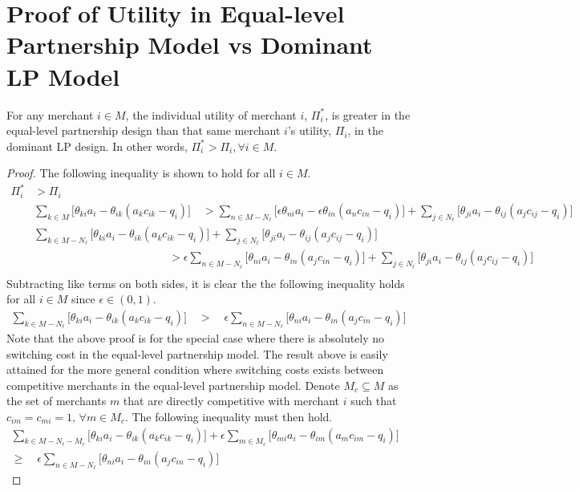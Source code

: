 \section{Proof of Utility in Equal-level Partnership Model vs Dominant LP Model}
\begin{theorem} \label{thm:utility}
For any merchant $i \in M$, the individual utility of merchant $i$, $\Pi_i^*$, is greater in the equal-level partnership design than that same merchant $i$'s utility, $\Pi_i$, in the dominant LP design. In other words, $\Pi_i^* > \Pi_i, \forall i \in M$.
\end{theorem}
%
\begin{proof}
The following inequality is shown to hold for all $i \in M$.
%
\begin{align*}
\Pi_i^* & > \Pi_i \\
& \sum_{k \in M} \big[\theta_{ki}a_i - \theta_{ik}(a_k c_{ik} - q_i) \big] \quad > \sum_{n \in M - N_\ell} \big[\epsilon \theta_{n i}a_i - \epsilon \theta_{i n}(a_n  c_{i n} - q_i) \big] + \sum_{j \in N_\ell} \big[\theta_{ji}a_i - \theta_{ij}(a_j c_{ij} - q_i) \big] \\
& \sum_{k \in M - N_\ell} \big[\theta_{ki}a_i - \theta_{ik}(a_k c_{ik} - q_i) \big] + \sum_{j \in N_\ell} \big[\theta_{ji}a_i - \theta_{ij}(a_j c_{ij} - q_i) \big]  \\
& \qquad \qquad \qquad \qquad \qquad \qquad > \epsilon\sum_{n \in M - N_\ell} \big[\theta_{n i}a_i - \theta_{i n}(a_j  c_{i n} - q_i) \big] + \sum_{j \in N_\ell} \big[\theta_{ji}a_i - \theta_{ij}(a_j c_{ij} - q_i) \big] \\
\end{align*}
%
Subtracting like terms on both sides, it is clear the the following inequality holds for all $i \in M$ since $\epsilon \in (0, 1)$.
\begin{align*}
\sum_{k \in M - N_\ell} \big[\theta_{ki}a_i - \theta_{ik}(a_k c_{ik} - q_i) \big] \quad > \quad \epsilon\sum_{n \in M - N_\ell} \big[\theta_{n i}a_i - \theta_{i n}(a_j  c_{i n} - q_i) \big] 
\end{align*}
%
Note that the above proof is for the special case where there is absolutely no switching cost in the equal-level partnership model. The result above is easily attained for the more general condition where switching costs exists between competitive merchants in the equal-level partnership model. Denote $M_c \subseteq M$ as the set of merchants $m$ that are directly competitive with merchant $i$ such that $c_{im} = c_{mi} = 1, \, \forall m \in M_c$. The following inequality must then hold.
\begin{align*}
\sum_{k \in M - N_\ell - M_c} \big[\theta_{ki}a_i - \theta_{ik}(a_k c_{ik} - q_i) \big] + \epsilon \sum_{m \in M_c} \big[\theta_{mi}a_i - \theta_{im}(a_m c_{im} - q_i) \big] \quad \\ 
\geq \quad \epsilon\sum_{n \in M - N_\ell} \big[\theta_{n i}a_i - \theta_{i n}(a_j  c_{i n} - q_i) \big] 
\end{align*}
\end{proof}

